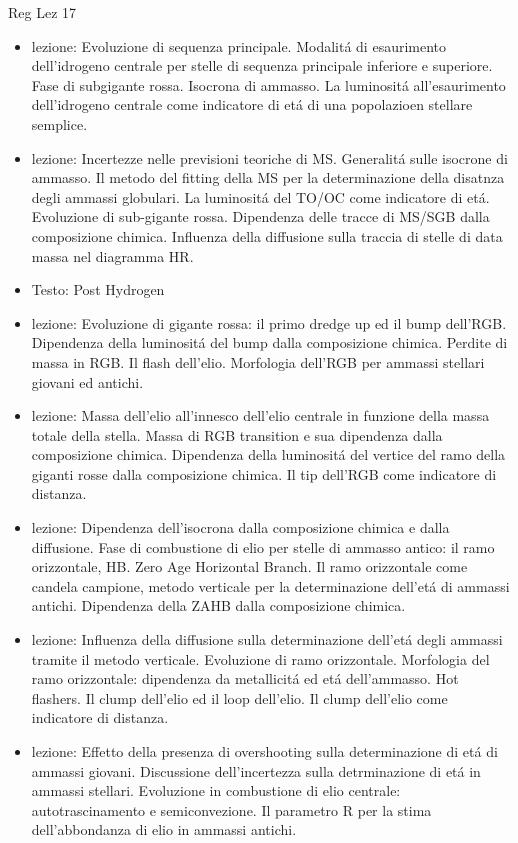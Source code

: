 \begin{frame}[allowframebreaks]{Reg Lez 17}
\begin{itemize}
\item lezione: Evoluzione di sequenza principale. Modalit\'a di esaurimento dell'idrogeno centrale per stelle di sequenza principale inferiore e superiore. Fase di subgigante rossa. Isocrona di ammasso. La luminosit\'a all'esaurimento dell'idrogeno centrale come indicatore di et\'a di una popolazioen stellare semplice. 
\item lezione: Incertezze nelle previsioni teoriche di MS. Generalit\'a sulle isocrone di ammasso. Il metodo del fitting della MS per la determinazione della disatnza degli ammassi globulari. La luminosit\'a del TO/OC come indicatore di et\'a. Evoluzione di sub-gigante rossa. Dipendenza delle tracce di MS/SGB dalla composizione chimica. Influenza della diffusione sulla traccia di stelle di data massa nel diagramma HR.
\item Testo: Post Hydrogen
\item lezione: Evoluzione di gigante rossa: il primo dredge up ed il bump dell'RGB. Dipendenza della luminosit\'a del bump dalla composizione chimica. Perdite di massa in RGB. Il flash dell'elio. Morfologia dell'RGB per ammassi stellari giovani ed antichi.
\item lezione: Massa dell'elio all'innesco dell'elio centrale in funzione della massa totale della stella. Massa di RGB transition e sua dipendenza dalla composizione chimica. Dipendenza della luminosit\'a del vertice del ramo della giganti rosse dalla composizione chimica. Il tip dell'RGB come indicatore di distanza.
\item lezione: Dipendenza dell'isocrona dalla composizione chimica e dalla diffusione. Fase di combustione di elio per stelle di ammasso antico: il ramo orizzontale, HB. Zero Age Horizontal Branch. Il ramo orizzontale come candela campione, metodo verticale per la determinazione dell'et\'a di ammassi antichi. Dipendenza della ZAHB dalla composizione chimica.
\item lezione: Influenza della diffusione sulla determinazione dell'et\'a degli ammassi tramite il metodo verticale. Evoluzione di ramo orizzontale. Morfologia del ramo orizzontale: dipendenza da metallicit\'a ed et\'a dell'ammasso. Hot flashers. Il clump dell'elio ed il loop dell'elio. Il clump dell'elio come indicatore di distanza.
\item lezione: Effetto della presenza di overshooting sulla determinazione di et\'a di ammassi giovani. Discussione dell'incertezza sulla detrminazione di et\'a in ammassi stellari. Evoluzione in combustione di elio centrale: autotrascinamento e semiconvezione. Il parametro R per la stima dell'abbondanza di elio in ammassi antichi.

\end{itemize}
\end{frame}
